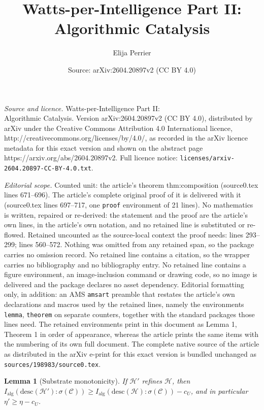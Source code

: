 \documentclass[10pt,a4paper]{amsart}
\title{Watts-per-Intelligence Part II:\\Algorithmic Catalysis}
\author{Elija Perrier}
\date{Source: arXiv:2604.20897v2 (CC BY 4.0)}
\newtheorem{lemma}{Lemma}
\newcommand{\Class}{\mathcal{C}}
\newcommand{\Hw}{\mathcal{H}}
\newcommand{\MutInfo}{I_{\mathrm{alg}}}
\newcommand{\descop}{\mathrm{desc}}
\begin{document}
\maketitle

\noindent\emph{Source and licence.} Watts-per-Intelligence Part II:\\Algorithmic Catalysis. Version arXiv:2604.20897v2 (CC BY 4.0), distributed by arXiv under the Creative Commons Attribution 4.0 International licence, http://creativecommons.org/licenses/by/4.0/, as recorded in the arXiv licence metadata for this exact version and shown on the abstract page https://arxiv.org/abs/2604.20897v2. Full licence notice: \texttt{licenses/arxiv-2604.20897-CC-BY-4.0.txt}.\par\smallskip

\noindent\textit{Editorial scope.} Counted unit: the article's theorem thm:composition (source0.tex lines 671--696). The article's complete original proof of it is delivered with it (source0.tex lines 697--717, one \texttt{proof} environment of 21 lines). No mathematics is written, repaired or re-derived: the statement and the proof are the article's own lines, in the article's own notation, and no retained line is substituted or re-flowed.  Retained uncounted as the source-local context the proof needs: lines 293--299; lines 560--572.  Nothing was omitted from any retained span, so the package carries no omission record.  No retained line contains a citation, so the wrapper carries no bibliography and no bibliography entry.  No retained line contains a figure environment, an image-inclusion command or drawing code, so no image is delivered and the package declares no asset dependency.  Editorial formatting only, in addition: an AMS \texttt{amsart} preamble that restates the article's own declarations and macros used by the retained lines, namely the environments \texttt{lemma}, \texttt{theorem} on separate counters, together with the standard packages those lines need.  The retained environments print in this document as Lemma 1, Theorem 1 in order of appearance, whereas the article prints the same items with the numbering of its own full document.  The complete native source of the article as distributed in the arXiv e-print for this exact version is bundled unchanged as \texttt{sources/198983/source0.tex}.
\begin{lemma}[Substrate monotonicity]
\label{lem:monotone}
If $\Hw'$ refines $\Hw$, then
$\MutInfo(\descop(\Hw'):\sigma(\Class))\ge
\MutInfo(\descop(\Hw):\sigma(\Class))-c_U$, and in particular
$\eta'\ge\eta-c_U$.
\end{lemma}
\end{document}
